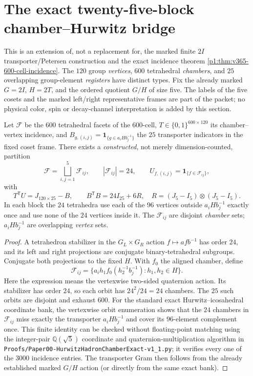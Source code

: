 \documentclass[11pt]{article}
\begin{document}
\section{The exact twenty-five-block chamber--Hurwitz bridge}
\label{p1:sec:v366-chamber-hurwitz-completion}
This is an extension of, not a replacement for, the marked finite
$2I$ transporter/Petersen construction and the exact incidence theorem
\ref{p1:thm:v365-600-cell-incidence}.  The $120$ group \emph{vertices},
$600$ tetrahedral \emph{chambers}, and $25$ overlapping group-element
\emph{registers} have distinct types.  Fix the already marked $G=2I$,
$H=2T$, and the ordered quotient $G/H$ of size five.  The labels of the
five cosets and the marked left/right representative frames are part of
the packet; no physical color, spin or decay-channel interpretation is
added by this section.

\begin{theorem}
\label{p1:thm:v366-chamber-transporter-complement}
Let $\mathscr F$ be the $600$ tetrahedral facets of the $600$-cell,
$T\in\{0,1\}^{600\times120}$ its chamber--vertex incidence, and
$B_{g,(i,j)}=\mathbf1_{\{g\in a_iHb_j^{-1}\}}$ the $25$ transporter
indicators in the fixed coset frame.  There exists a \emph{constructed},
not merely dimension-counted, partition
\[
 \mathscr F=\bigsqcup_{i,j=1}^{5}\mathscr F_{ij},\qquad
 |\mathscr F_{ij}|=24,\qquad
 U_{f,(i,j)}=\mathbf1_{\{f\in\mathscr F_{ij}\}},
\]
with
\begin{equation}\label{p1:eq:v366-TU}
 \boxed{T^{\mathsf T}U=J_{120\times25}-B},\qquad
 B^{\mathsf T}B=24I_{25}+6R,\quad
 R=(J_5-I_5)\otimes(J_5-I_5).
\end{equation}
In each block the $24$ tetrahedra use each of the $96$ vertices
outside $a_iHb_j^{-1}$ exactly once and use none of the $24$ vertices
inside it.  The $\mathscr F_{ij}$ are disjoint \emph{chamber} sets;
$a_iHb_j^{-1}$ are overlapping \emph{vertex} sets.
\end{theorem}
\begin{proof}
A tetrahedron stabilizer in the $G_L\times G_R$ action
$f\mapsto afb^{-1}$ has order $24$, and its left and right
projections are conjugate binary-tetrahedral subgroups.  Conjugate both
projections to the fixed $H$.  With $f_0$ the aligned chamber, define
\[
 \mathscr F_{ij}=\{a_i h_1 f_0(h_2^{-1}b_j^{-1}):h_1,h_2\in H\}.
\]
Here the expression means the vertexwise two-sided quaternion action.
Its stabilizer has order $24$, so each orbit has $24^2/24=24$
chambers.  The $25$ such orbits are disjoint and exhaust $600$.
For the standard exact Hurwitz--icosahedral coordinate bank, the
vertexwise orbit enumeration shows that the $24$ chambers in
$\mathscr F_{ij}$ miss exactly the transporter $a_iHb_j^{-1}$ and
cover its $96$-element complement once.  This finite identity can
be checked without floating-point matching using the integer-pair
$\mathbb Q(\sqrt5)$ coordinate and quaternion-multiplication algorithm
in \texttt{Proofs/Paper00-HurwitzHadronChamberExact-v1\_1.py}; it
verifies every one of the $3000$ incidence entries.  The transporter
Gram then follows from the already established marked $G/H$ action
(or directly from the same exact bank).
\end{proof}
\end{document}

